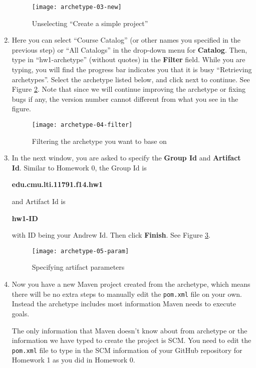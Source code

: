\begin{enumerate}
\begin{figure}[t]
\centering
\texttt{[image: archetype-03-new]}
\caption{Unselecting ``Create a simple project''\label{fig:archetype-03-new}}
\end{figure}

\item Here you can select ``Course Catalog'' (or other names you specified in
the previous step) or ``All Catalogs'' in the drop-down menu for
\textbf{Catalog}. Then, type in ``hw1-archetype'' (without quotes) in the \textbf{Filter}
field. While you are typing, you will find the progress bar indicates you that
it is busy ``Retrieving archetypes''. Select the archetype listed below, and
click next to continue. See Figure \ref{fig:archetype-04-filter}. Note that
since we will continue improving the archetype or fixing bugs if any, the
version number cannot different from what you see in the figure.

\begin{figure}[t]
\centering
\texttt{[image: archetype-04-filter]}
\caption{Filtering the archetype you want to base on\label{fig:archetype-04-filter}}
\end{figure}

\item In the next window, you are asked to specify the \textbf{Group Id} and
\textbf{Artifact Id}. Similar to Homework 0, the Group Id is

\begin{center}
\textbf{edu.cmu.lti.11791.f14.hw1}
\end{center}

and Artifact Id is

\begin{center}
\textbf{hw1-ID}
\end{center}

with ID being your Andrew Id. Then click \textbf{Finish}. See Figure
\ref{fig:archetype-05-param}.

\begin{figure}[t]
\centering
\texttt{[image: archetype-05-param]}
\caption{Specifying artifact parameters\label{fig:archetype-05-param}}
\end{figure}

\item Now you have a new Maven project created from the archetype, which means
there will be no extra steps to manually edit the \verb|pom.xml| file on your
own. Instead the archetype includes most information Maven needs to execute
goals.

The only information that Maven doesn't know about from archetype or the
information we have typed to create the project is SCM. You need to edit the
\texttt{pom.xml} file to type in the SCM information of your GitHub repository
for Homework 1 as you did in Homework 0.

\end{enumerate}

